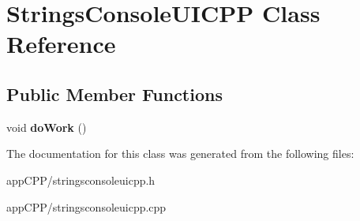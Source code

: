 \hypertarget{classStringsConsoleUICPP}{\section{Strings\-Console\-U\-I\-C\-P\-P Class Reference}
\label{classStringsConsoleUICPP}
}
\subsection*{Public Member Functions}
\begin{DoxyCompactItemize}
\item 
\hypertarget{classStringsConsoleUICPP_a6eb6ebbf3e7692efe4c9f9cd6ad63a6e}{void {\bfseries do\-Work} ()}\label{classStringsConsoleUICPP_a6eb6ebbf3e7692efe4c9f9cd6ad63a6e}

\end{DoxyCompactItemize}


The documentation for this class was generated from the following files\-:\begin{DoxyCompactItemize}
\item 
app\-C\-P\-P/stringsconsoleuicpp.\-h\item 
app\-C\-P\-P/stringsconsoleuicpp.\-cpp\end{DoxyCompactItemize}
